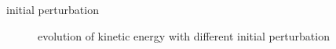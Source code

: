 \documentclass{beamer}
\begin{document}
\begin{frame}{initial perturbation}
	\begin{figure}[H]
		\centering
		\caption{ evolution of kinetic energy with different initial perturbation }
	\end{figure}
\end{frame}
\end{document}
